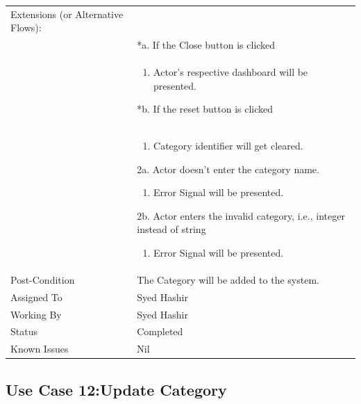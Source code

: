 \documentclass[12pt,a4paper]{article}
\begin{document}
\begin{longtable}{| p{3cm}|p{12cm}|}
Extensions (or Alternative Flows):\\
& *a. If the Close button is clicked \\
& \begin{enumerate}
		\item Actor's respective dashboard will be presented.
	\end{enumerate}
*b. If the reset button is clicked \\
&	\begin{enumerate}
		\item Category identifier will get cleared.
	\end{enumerate}
2a. Actor doesn't enter the category name.
 	\begin{enumerate}
		\item Error Signal will be presented.
	\end{enumerate}
2b. Actor enters the invalid category, i.e., integer instead of string
	\begin{enumerate}
		\item Error Signal will be presented.
	\end{enumerate}
\\ \hline
Post-Condition &    The Category will be added to the system. \\ \hline
Assigned To &  Syed Hashir
\\ \hline
Working By &   Syed Hashir
\\ \hline
Status & 	Completed	
\\ \hline
Known Issues & Nil
\\\hline
\end{longtable}

\subsection{Use Case 12:Update Category}
\end{document}

